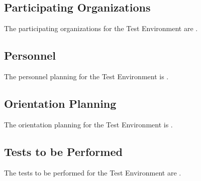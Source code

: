 \subsection{Participating Organizations}
\label{loc:Organizations\TestEnvName}


The participating organizations for the \TestEnvName\xspace Test Environment are \TBD.


\subsection{Personnel}
\label{loc:Personnel\TestEnvName}


The personnel planning for the \TestEnvName\xspace Test Environment is \TBD.


\subsection{Orientation Planning}
\label{loc:Orientation\TestEnvName}


The orientation planning for the \TestEnvName\xspace Test Environment is \TBD.


\subsection{Tests to be Performed}
\label{loc:Tests\TestEnvName}


The tests to be performed for the \TestEnvName\xspace Test Environment are \TBD.%

